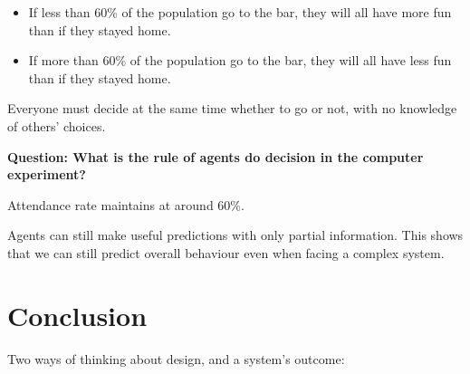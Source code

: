 \documentclass[a4paper, openany]{book}
\begin{document}
\begin{itemize}
  \item If less than 60\% of the population go to the bar, they will all have more fun than if they stayed home.
  \item If more than 60\% of the population go to the bar, they will all have less fun than if they stayed home.
\end{itemize}

Everyone must decide at the same time whether to go or not, with no knowledge of others' choices.

\textbf{Question: What is the rule of agents do decision in the computer experiment?}

Attendance rate maintains at around 60\%.

Agents can still make useful predictions with only partial information. This shows that we can still predict overall behaviour even when facing a complex system.

\section{Conclusion}

Two ways of thinking about design, and a system's outcome:
\end{document}
